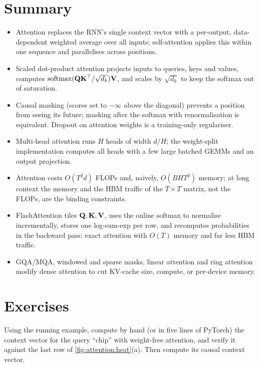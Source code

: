 \section{Summary}\label{sec:attention:summary}
\begin{itemize}
  \item Attention replaces the RNN's single context vector with a per-output, data-dependent
  weighted average over all inputs; self-attention applies this within one sequence and parallelises
  across positions.
  \item Scaled dot-product attention projects inputs to queries, keys and values,
  computes $\operatorname{softmax}(\mathbf{Q}\mathbf{K}^\top/\sqrt{d_k})\mathbf{V}$, and scales by $\sqrt{d_k}$ to keep the softmax
  out of saturation.
  \item Causal masking (scores set to $-\infty$ above the diagonal) prevents a position from seeing its
  future; masking after the softmax with renormalisation is equivalent. Dropout on attention weights
  is a training-only regulariser.
  \item Multi-head attention runs $H$ heads of width $d/H$; the weight-split implementation computes
  all heads with a few large batched GEMMs and an output projection.
  \item Attention costs $O(T^2d)$ FLOPs and, naively, $O(BHT^2)$ memory; at long context the memory and
  the HBM traffic of the $T\times T$ matrix, not the FLOPs, are the binding constraints.
  \item FlashAttention tiles $\mathbf{Q},\mathbf{K},\mathbf{V}$, uses the online softmax to normalise incrementally,
  stores one log-sum-exp per row, and recomputes probabilities in the backward pass: exact attention
  with $O(T)$ memory and far less HBM traffic.
  \item GQA/MQA, windowed and sparse masks, linear attention and ring attention modify dense attention
  to cut KV-cache size, compute, or per-device memory.
\end{itemize}

\section{Exercises}\label{sec:attention:exercises}

\begin{exercise}
Using the running example, compute by hand (or in five lines of PyTorch) the context vector for the
query ``chip'' with weight-free attention, and verify it against the last row of
\cref{fig:attention:heat}(a). Then compute its causal context vector.
\end{exercise}


